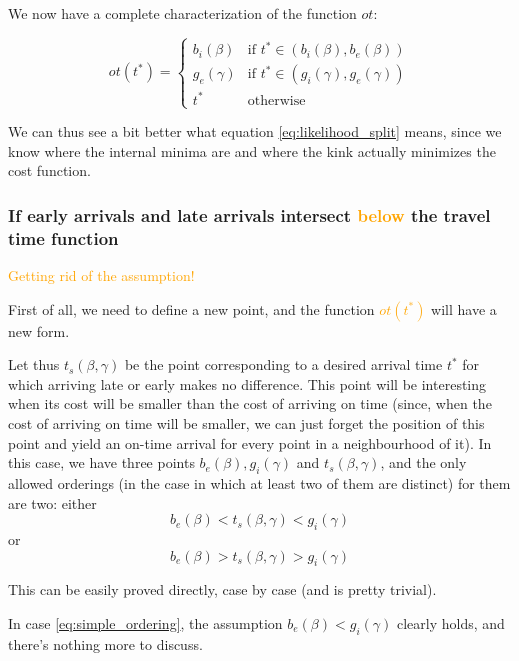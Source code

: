 \documentclass{article}
\begin{document}
We now have a complete characterization of the function \(ot\):

\begin{equation}
  \label{eq:characterized_ot}
  ot(t^*) =
  \begin{cases}
    b_i(\beta) & \text{if } t^* \in (b_i(\beta), b_e(\beta)) \\
    g_e(\gamma) & \text{if } t^* \in (g_i(\gamma), g_e(\gamma)) \\
    t^* & \text{otherwise}
  \end{cases}
\end{equation}

We can thus see a bit better what equation \eqref{eq:likelihood_split} means, since we know where the internal minima are and where the kink actually minimizes the cost function.

\subsubsection{If early arrivals and late arrivals intersect \textcolor{orange}{below} the travel time function}

\textcolor{orange}{Getting rid of the assumption!}

First of all, we need to define a new point, and the function \textcolor{orange}{\(ot(t^*)\)} will have a new form.

Let thus \(t_s(\beta, \gamma)\) be the point corresponding to a desired arrival time \(t^*\) for which arriving late or early makes no difference.
This point will be interesting when its cost will be smaller than the cost of arriving on time (since, when the cost of arriving on time will be smaller,
we can just forget the position of this point and yield an on-time arrival for every point in a neighbourhood of it).
In this case, we have three points \(b_e(\beta), g_i(\gamma)\) and \(t_s(\beta, \gamma)\),
and the only allowed orderings (in the case in which at least two of them are distinct) for them are two:
either
\begin{equation}\label{eq:simple_ordering}
  b_e(\beta) < t_s(\beta, \gamma) < g_i(\gamma)
\end{equation}
or
\begin{equation}\label{eq:complex_ordering}
  b_e(\beta) > t_s(\beta, \gamma) > g_i(\gamma)
\end{equation}

This can be easily proved directly, case by case (and is pretty trivial).

In case \eqref{eq:simple_ordering}, the assumption \(b_e(\beta) < g_i(\gamma)\) clearly holds, and there's nothing more to discuss.
\end{document}
